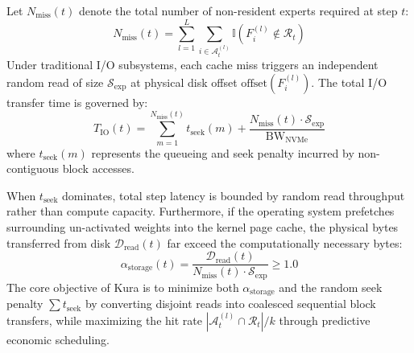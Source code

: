 Let $N_{\text{miss}}(t)$ denote the total number of non-resident experts required at step $t$:
\begin{equation}
    N_{\text{miss}}(t) = \sum_{l=1}^L \sum_{i \in \mathcal{A}_t^{(l)}} \mathbb{I}\left( F_i^{(l)} \notin \mathcal{R}_t \right)
\end{equation}
Under traditional I/O subsystems, each cache miss triggers an independent random read of size $\mathcal{S}_{\text{exp}}$ at physical disk offset $\text{offset}(F_i^{(l)})$.
The total I/O transfer time is governed by:
\begin{equation}
    T_{\text{IO}}(t) = \sum_{m=1}^{N_{\text{miss}}(t)} t_{\text{seek}}(m) + \frac{N_{\text{miss}}(t) \cdot \mathcal{S}_{\text{exp}}}{\text{BW}_{\text{NVMe}}}
    \label{eq:random_io_time}
\end{equation}
where $t_{\text{seek}}(m)$ represents the queueing and seek penalty incurred by non-contiguous block accesses.

When $t_{\text{seek}}$ dominates, total step latency is bounded by random read throughput rather than compute capacity.
Furthermore, if the operating system prefetches surrounding un-activated weights into the kernel page cache, the physical bytes transferred from disk $\mathcal{D}_{\text{read}}(t)$ far exceed the computationally necessary bytes:
\begin{equation}
    \alpha_{\text{storage}}(t) = \frac{\mathcal{D}_{\text{read}}(t)}{N_{\text{miss}}(t) \cdot \mathcal{S}_{\text{exp}}} \ge 1.0
\end{equation}
The core objective of Kura is to minimize both $\alpha_{\text{storage}}$ and the random seek penalty $\sum t_{\text{seek}}$ by converting disjoint reads into coalesced sequential block transfers, while maximizing the hit rate $|\mathcal{A}_t^{(l)} \cap \mathcal{R}_t| / k$ through predictive economic scheduling.
